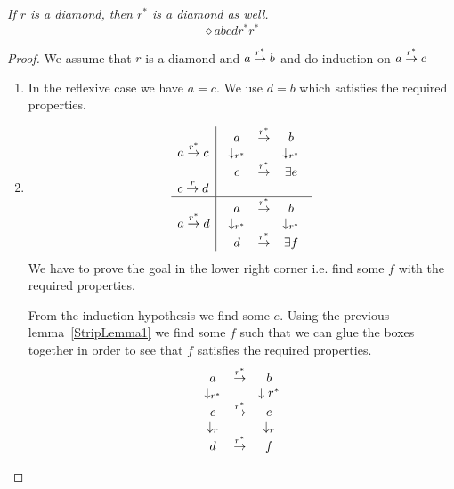 \begin{lemma}
    \label{StripLemma2}
    \emph{ If $r$ is a diamond, then $r^*$ is a diamond as well.}
    $$
    \diamond a b c d {r^*} {r^*}
    $$

    \begin{proof}
        We assume that $r$ is a diamond and $a \torel{r^*} b$ and do induction
        on $a \torel{r^*} c$

        \begin{enumerate}
            \item In the reflexive case we have $a = c$. We use $d = b$ which
                satisfies the required properties.

            \item
                $$
                \begin{array}{l|l}
                    a \torel{r^*} c
                    &
                    \diamond a b c e {r^*} {r^*}
                    \\
                    c \torel r d
                    \\
                    \hline
                    a \torel{r^*} d
                    &
                    \diamond a b d f {r^*} {r^*}
                \end{array}
                $$
                We have to prove the goal in the lower right corner i.e. find
                some $f$ with the required properties.

                From the induction hypothesis we find some $e$. Using the
                previous lemma~\ref{StripLemma1} we find some $f$ such that we
                can glue the boxes together in order to see that $f$ satisfies
                the required properties.
                $$
                \begin{array}{ccc}
                    a & \torel{r^*} & b
                    \\
                    \downarrow_{r^*} & & \downarrow{r^*}
                    \\
                    c & \torel{r^*} & e
                    \\
                    \downarrow_r & & \downarrow_r
                    \\
                    d & \torel{r^*} & f
                \end{array}
                $$
        \end{enumerate}
    \end{proof}
\end{lemma}


